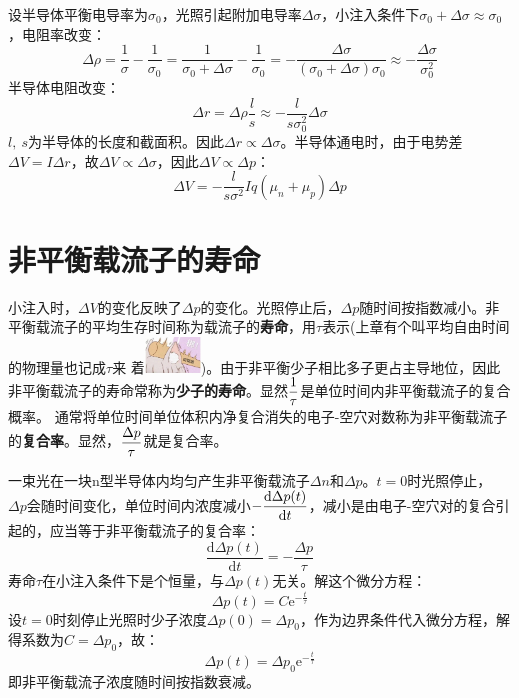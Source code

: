 设半导体平衡电导率为$\sigma_0$，光照引起附加电导率$\Delta \sigma$，小注入条件下$\sigma_0+\Delta \sigma\approx\sigma_0$，电阻率改变：
\begin{equation}
    \Delta\rho=\frac{1}{\sigma}-\frac{1}{\sigma_0}=\frac{1}{\sigma_0+\Delta\sigma}-\frac{1}{\sigma_0}=-\frac{\Delta\sigma}{(\sigma_0+\Delta\sigma)\sigma_0}\approx-\frac{\Delta\sigma}{\sigma_0^2}
\end{equation}
半导体电阻改变：
\begin{equation}
    \Delta r=\Delta\rho\frac{l}{s}\approx-\frac{l}{s\sigma_0^2}\Delta\sigma
\end{equation}
$l,\ s$为半导体的长度和截面积。因此$\Delta r\propto \Delta \sigma$。半导体通电时，由于电势差$\Delta V=I\Delta r$，故$\Delta V\propto\Delta\sigma$，因此$\Delta V\propto\Delta p$：
\begin{equation}
    \Delta V=-\frac{l}{s\sigma^2}Iq(\mu_n+\mu_p)\Delta p
\end{equation}

\section{非平衡载流子的寿命}

小注入时，$\Delta V$的变化反映了$\Delta p$的变化。光照停止后，$\Delta p$随时间按指数减小。非平衡载流子的平均生存时间称为载流子的\textbf{寿命}，用$\tau$表示(上章有个叫平均自由时间的物理量也记成$\tau$来
着\includegraphics[width=4em, align=c]{idiot.jpg})。由于非平衡少子相比多子更占主导地位，因此非平衡载流子的寿命常称为\textbf{少子的寿命}。显然$\displaystyle \frac{1}{\tau}$是单位时间内非平衡载流子的复合概率。\vspace{1ex}
通常将单位时间单位体积内净复合消失的电子-空穴对数称为非平衡载流子的\textbf{复合率}。显然，$\displaystyle \frac{\Delta p}{\tau}$就是复合率。

一束光在一块n型半导体内均匀产生非平衡载流子$\Delta n$和$\Delta p$。$t=0$时光照停止，\vspace{1ex}
$\Delta p$会随时间变化，单位时间内浓度减小$\displaystyle -\frac{\mathrm{d}\Delta p(t)}{\mathrm{d}t}$，减小是由电子-空穴对的复合引起的，应当等于非平衡载流子的复合率：
\begin{equation}
    \frac{\mathrm{d}\Delta p(t)}{\mathrm{d}t}=-\frac{\Delta p}{\tau}
\end{equation}
寿命$\tau$在小注入条件下是个恒量，与$\Delta p(t)$无关。解这个微分方程：
\begin{equation}
    \Delta p(t)=C\mathrm{e}^{-\frac{t}{\tau}}
\end{equation}
设$t=0$时刻停止光照时少子浓度$\Delta p(0)=\Delta p_0$，作为边界条件代入微分方程，解得系数为$C=\Delta p_0$，故：
\begin{equation}
    \Delta p(t)=\Delta p_0\mathrm{e}^{-\frac{t}{\tau}}
\end{equation}
即非平衡载流子浓度随时间按指数衰减。


